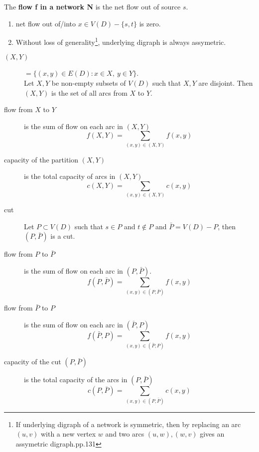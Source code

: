 \begin{definition}
	The \textbf{flow f in a network N} is the net flow out of source $s$.
\end{definition}

\begin{remark}
	\begin{enumerate}
		\item net flow out of/into $x \in V(D)-\{s,t\}$ is zero.
		\item Without loss of generality\footnote{If underlying digraph of a network is symmetric, then by replacing an arc $(u,v)$ with a new vertex $w$ and two arcs $(u,w),(w,v)$ gives an assymetric digraph.\cite{chartrand}pp.131}, underlying digraph is always assymetric.
	\end{enumerate}
\end{remark}

\begin{description}
	\item[$(X,Y)$] $=\{ (x,y) \in E(D) : x \in X,\ y \in Y \}$.\\
		Let $X,Y$ be non-empty subsets of $V(D)$ such that $X,Y$ are disjoint. Then $(X,Y)$ is the set of all arcs from $X$ to $Y$.
	\item[flow from $X$ to $Y$] is the sum of flow on each arc in $(X,Y)$
		\begin{equation}
		f(X,Y) = \sum_{(x,y) \in (X,Y)} f(x,y)
		\end{equation}
	\item[capacity of the partition $(X,Y)$] is the total capacity of arcs in $(X,Y)$
		\begin{equation}
		c(X,Y) = \sum_{(x,y) \in (X,Y)} c(x,y)
		\end{equation}
	\item[cut] Let $P \subset V(D)$ such that $s \in P$ and $t \not\in P$ and $\bar{P} = V(D)-P$, then $(P,\bar{P})$ is a cut.
	\item[flow from $P$ to $\bar{P}$] is the sum of flow on each arc in $(P,\bar{P})$.
		\begin{equation}
		f(P,\bar{P}) = \sum_{(x,y) \in (P,\bar{P})} f(x,y)
		\end{equation}
	\item[flow from $\bar{P}$ to $P$] is the sum of flow on each arc in $(\bar{P},P)$
		\begin{equation}
		f(\bar{P},P) = \sum_{(x,y) \in (\bar{P},P)} f(x,y)
		\end{equation}
	\item[capacity of the cut $(P,\bar{P})$] is the total capacity of the arcs in $(P,\bar{P})$
		\begin{equation}
		c(P,\bar{P}) = \sum_{(x,y) \in (P,\bar{P})} c(x,y)
		\end{equation}
\end{description}

